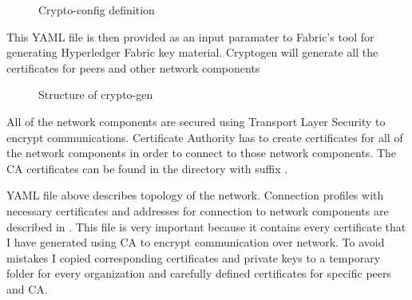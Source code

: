 \begin{figure}[H]
    \begin{center}
        \begin{minipage}{\linewidth}
            \begin{center}
                \caption{Crypto-config definition}
                \label{obr 1.2.1}
            \end{center}
        \end{minipage}
    \end{center}
\end{figure}

This YAML file is then provided as an input paramater to Fabric's   tool for generating Hyperledger Fabric key material. Cryptogen will generate all the certificates for peers and other network components

\begin{figure}[H]
    \begin{center}
        \begin{minipage}{\linewidth}
            \begin{center}
                \caption{Structure of crypto-gen}
                \label{obr 1.2.1}
            \end{center}
        \end{minipage}
    \end{center}
\end{figure}

All of the network components are secured using Transport Layer Security to encrypt communications. Certificate Authority has to create certificates for all of the network components in order to connect to those network components. The CA certificates can be found in the directory  with suffix .

YAML file above describes topology of the network. Connection profiles with necessary certificates and addresses for connection to network components are described in . This file is very important because it contains every certificate that I have generated using CA to encrypt communication over network. To avoid mistakes I copied corresponding certificates and private keys to a temporary folder for every organization and carefully defined certificates for specific peers and CA. 

